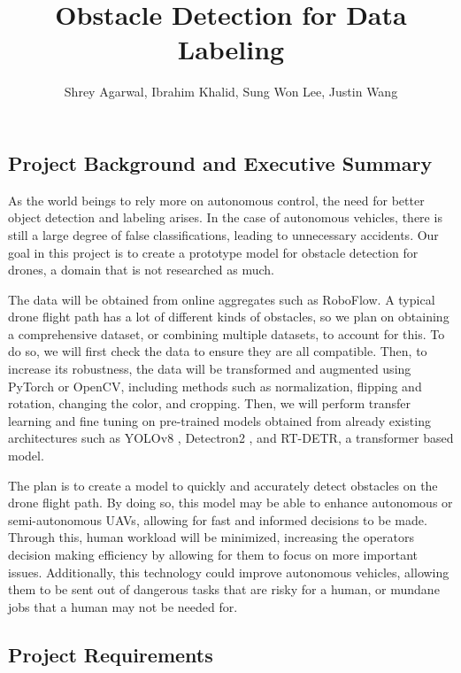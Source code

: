 \documentclass[stu,12pt,floatsintext]{apa7}
\title{Obstacle Detection for Data Labeling}
\author{Shrey Agarwal, Ibrahim Khalid, Sung Won Lee, Justin Wang}
\begin{document}
\maketitle

\subsection{Project Background and Executive Summary}
As the world beings to rely more on autonomous control, the need for better object detection and labeling arises. In the case of autonomous vehicles, there is still a large degree of false classifications, leading to unnecessary accidents. Our goal in this project is to create a prototype model for obstacle detection for drones, a domain that is not researched as much. 

The data will be obtained from online aggregates such as RoboFlow. A typical drone flight path has a lot of different kinds of obstacles, so we plan on obtaining a comprehensive dataset, or combining multiple datasets, to account for this. To do so, we will first check the data to ensure they are all compatible. Then, to increase its robustness, the data will be transformed and augmented using PyTorch or OpenCV, including methods such as normalization, flipping and rotation, changing the color, and cropping. Then, we will perform transfer learning and fine tuning on pre-trained models obtained from already existing architectures such as YOLOv8 \parencite{varghese_yolov8_2024}, Detectron2 \parencite{wu2019detectron2}, and RT-DETR, a transformer based model.

The plan is to create a model to quickly and accurately detect obstacles on the drone flight path. By doing so, this model may be able to enhance autonomous or semi-autonomous UAVs, allowing for fast and informed decisions to be made. Through this, human workload will be minimized, increasing the operators decision making efficiency by allowing for them to focus on more important issues. Additionally, this technology could improve autonomous vehicles, allowing them to be sent out of dangerous tasks that are risky for a human, or mundane jobs that a human may not be needed for.

\subsection{Project Requirements}
\end{document}
